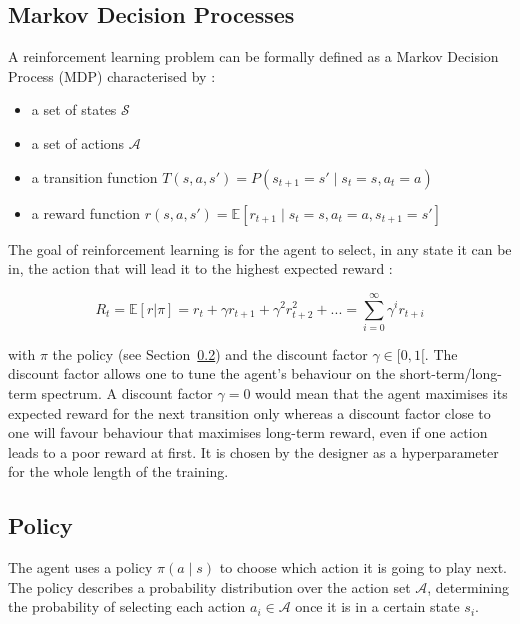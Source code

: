 \subsection{Markov Decision Processes}
A reinforcement learning problem can be formally defined as a Markov 
Decision Process (MDP)  characterised by :
\begin{itemize}
	\item a set of states $\mathcal{S}$
	\item a set of actions $\mathcal{A}$
	\item a transition function 
		$T(s, a, s') = P(s_{t+1} = s' \mid s_t = s, a_t = a)$
	\item a reward function 
		$r(s, a, s') = \mathbb{E}
		 [r_{t+1} \mid s_t = s, a_t = a, s_{t+1} = s']$
\end{itemize}

The goal of reinforcement learning is for the agent to select, in any state it
can be in, the action that will lead it to the highest expected reward :

\begin{equation}
\label{eq:discounted_reward}
R_t = \mathbb{E}[r|\pi] = r_t + \gamma r_{t+1} + \gamma^2 r_{t+2}^2 + ... =
 \sum\limits_{i=0}^\infty \gamma^i r_{t+i}
\end{equation}

\noindent with $\pi$ the policy (see Section~\ref{sec:policy}) and 
the discount factor  $\gamma \in [0, 1[$.
The discount factor allows one to tune the agent's behaviour on the
short-term/long-term spectrum. A discount factor $\gamma=0$ would mean that the
agent maximises its expected reward for the next transition only whereas a
discount factor close to one will favour behaviour that maximises long-term
reward, even if one action leads to a poor reward at first. It is chosen
by the designer as a hyperparameter for the whole length of the training.\\

\subsection{Policy}
\label{sec:policy}
The agent uses a policy $\pi(a \mid s)$ to choose which action it is
going to play next. The policy describes a probability
distribution over the action set $\mathcal{A}$, determining the probability of
selecting each action $a_i \in \mathcal{A}$ once it is
in a certain state $s_i$.\\

